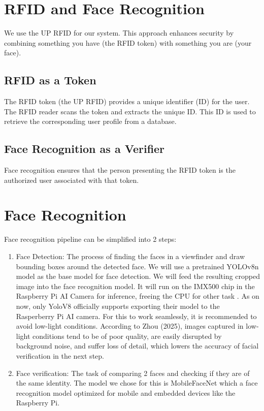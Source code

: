 \section{RFID and Face Recognition}
 We use the UP RFID for our system. This approach enhances security by combining something you have (the RFID token) with something you are (your face).
 \subsection{RFID as a Token}
 The RFID token (the UP RFID) provides a unique identifier (ID) for the user. The RFID reader scans the token and extracts the unique ID. This ID is used to retrieve the corresponding user profile from a database.
 \subsection{Face Recognition as a Verifier}
  Face recognition ensures that the person presenting the RFID token is the authorized user associated with that token.
 	
\section{Face Recognition}
Face recognition pipeline can be simplified into 2 steps:
\begin{enumerate}
	\item Face Detection: The process of finding the faces in a viewfinder and draw bounding boxes around the detected face. We will use a pretrained YOLOv8n model as the base model for face detection. We will feed the resulting cropped image into the face recognition model. It will run on the IMX500 chip in the Raspberry Pi AI Camera for inference, freeing the CPU for other task \cite{sony_imx500}. As on now, only YoloV8 officially supports exporting their model to the Rasperberry Pi AI camera\cite{ultralytics_imx500}. For this to work seamlessly, it is recommended to avoid low-light conditions. According to Zhou (2025), images captured in low-light conditions tend to be of poor quality, are easily disrupted by background noise, and suffer loss of detail, which lowers the accuracy of facial verification in the next step.
	
	\item Face verification: The task of comparing 2 faces and checking if they are of the same identity. The model we chose for this is MobileFaceNet which a face recognition model optimized for mobile and embedded devices like the Raspberry Pi\cite{chen2018mobilefacenets}.
\end{enumerate}


